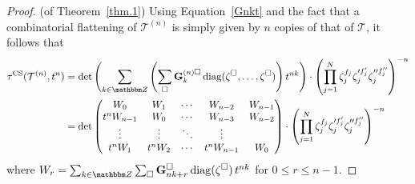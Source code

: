\documentclass[12pt,reqno]{amsart}
\theoremstyle{definition}
\def\BZ{\mathbbm Z}
\def\calT{\mathcal T}
\def\CS{\mathrm{CS}}
\begin{document}
\begin{proof}(of Theorem~\ref{thm.1})
Using Equation~\eqref{Gnkt} and the fact that a combinatorial flattening of
$\calT^{(n)}$ is simply given by $n$ copies of that of $\calT$, it follows that  
\begin{align}
\tau^\CS(\calT^{(n)},t^n) &= \det\left( \displaystyle\sum_{k \in \BZ}
  \left(  \sum_\square \mathbf{G}_k^{(n)\square}\,
    \mathrm{diag}(\zeta^\square,\ldots,\zeta^\square)\right) t^{nk}\right)  \cdot
\left(\prod_{j=1}^N\zeta_j^{f_j} \zeta_j'^{f_j'} \zeta_j''^{f_j''}\right)^{-n}  \\
&=\det \begin{pmatrix*}[c]
W_0 &  W_1& \cdots & W_{n-2}& W_{n-1} \\
t^{n} W_{n-1} &  W_0& \cdots & W_{n-3}& W_{n-2}  \\
\vdots & \vdots & \ddots & \vdots \\
t^{n} W_1 & t^n W_2& \cdots &t^n W_{n-1}& W_0 
\end{pmatrix*}
\cdot  \left(\prod_{j=1}^N\zeta_j^{f_j} \zeta_j'^{f_j'} \zeta_j''^{f_j''}\right)^{-n}
\label{eqn:cyctor}
\end{align}
where  $W_r = \sum_{k \in \BZ} \sum_\square \mathbf{G}_{nk+r}^{\square} \,
\mathrm{diag} (\zeta^\square)\,t^{nk} $ for  $0 \leq r \leq n-1$.
	

\end{proof}
\end{document}
